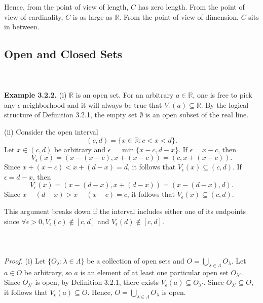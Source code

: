 \documentclass{article}
\begin{document}
            Hence, from the point of view of length, $C$ has zero length. From the point of view of cardinality, $C$ is as large as $\mathbb{R}$. From the point of view of dimension, $C$ sits in between. 
            
            \subsection{Open and Closed Sets}
            \\ \\
            \textbf{Example 3.2.2.} (i) $\mathbb{R}$ is an open set. For an arbitrary $a \in \mathbb{R}$, one is free to pick any $\epsilon$-neighborhood and it will always be true that $V_\epsilon(a) \subseteq \mathbb{R}$. By the logical structure of Definition 3.2.1, the empty set $\emptyset$ is an open subset of the real line.
            
            (ii) Consider the open interval
            \begin{equation*}
                (c,d) = \{x \in \mathbb{R}: c < x < d\}.
            \end{equation*}
            Let $x \in (c,d)$ be arbitrary and $\epsilon = \min\{x-c,d-x\}$. If $\epsilon = x-c$, then \begin{equation*}
                V_\epsilon(x) = (x-(x-c), x+(x-c)) = (c, x+(x-c)).
            \end{equation*}
            Since $x+(x-c) < x+(d-x) = d$, it follows that $V_\epsilon(x) \subseteq (c,d)$. If $\epsilon = d-x$, then
            \begin{equation*}
                V_\epsilon(x) = (x-(d-x),x+(d-x)) = (x-(d-x),d).
            \end{equation*}
            Since $x-(d-x) > x-(x-c) = c$, it follows that $V_\epsilon(x) \subseteq (c,d)$.
            
            This argument breaks down if the interval includes either one of its endpoints since $\forall \epsilon > 0, V_\epsilon(c) \notin [c,d]$ and $V_\epsilon(d) \notin [c,d]$.
            \\ \\
            \\ \\
            \textit{Proof.} (i) Let $\{O_\lambda : \lambda \in \Lambda\}$ be a collection of open sets and $O = \bigcup_{\lambda \in \Lambda} O_\lambda$. Let $a \in O$ be arbitrary, so $a$ is an element of at least one particular open set $O_{\lambda'}$. Since $O_{\lambda'}$ is open, by Definition 3.2.1, there exists $V_\epsilon(a) \subseteq O_{\lambda'}$. Since $O_{\lambda'} \subseteq O$, it follows that $V_\epsilon(a) \subseteq O$. Hence, $O = \bigcup_{\lambda \in \Lambda} O_\lambda$ is open.
            
\end{document}
